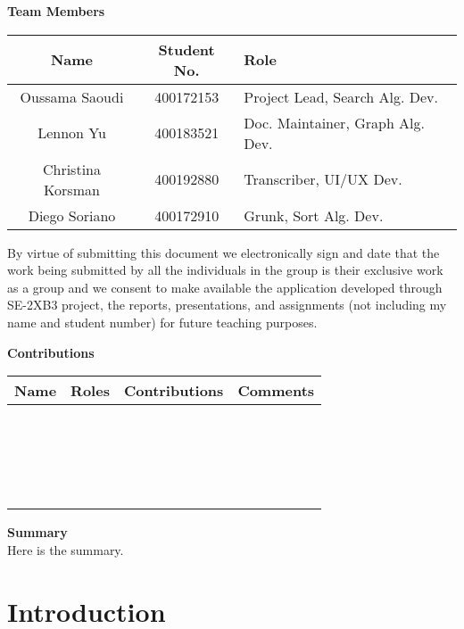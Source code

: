 \documentclass[12pt]{article}
\begin{document}
\Large \noindent \textbf{Team Members}\\
\normalsize
\begin{center}
    \begin{tabular}{|| c | c | l ||} 
    \hline
    Name & Student No. & Role\\
    \hline\hline
    Oussama Saoudi & 400172153 & Project Lead, Search Alg. Dev. \\ 
    \hline
    Lennon Yu & 400183521 & Doc. Maintainer, Graph Alg. Dev. \\
    \hline
    Christina Korsman & 400192880 & Transcriber, UI/UX Dev. \\
    \hline
    Diego Soriano & 400172910 & Grunk, Sort Alg. Dev. \\
    \hline
\end{tabular}
\end{center}

\normalsize
By virtue of submitting this document we electronically sign and date
that the work being submitted by all the individuals in the group is
their exclusive work as a group and we consent to make available the
application developed through SE-2XB3 project, the reports,
presentations, and assignments (not including my name and student number)
for future teaching purposes. 

\newpage
\Large \textbf{Contributions}
\normalsize
\begin{center}
    \begin{tabular}{|| c | c | l | p{7cm} ||} 
    \hline
    Name & Roles & Contributions & Comments\\
    \hline\hline
    ~ & ~ & ~ \\ 
    \hline
    ~ & ~ & ~ \\
    \hline
    ~ & ~ & ~ \\
    \hline
    ~ & ~ & ~ \\
    \hline
\end{tabular}
\end{center}

\newpage
\Large \noindent \textbf{Summary}\\
\normalsize
Here is the summary.

\newpage
\large
\tableofcontents

\section{Introduction}   
\end{document}
